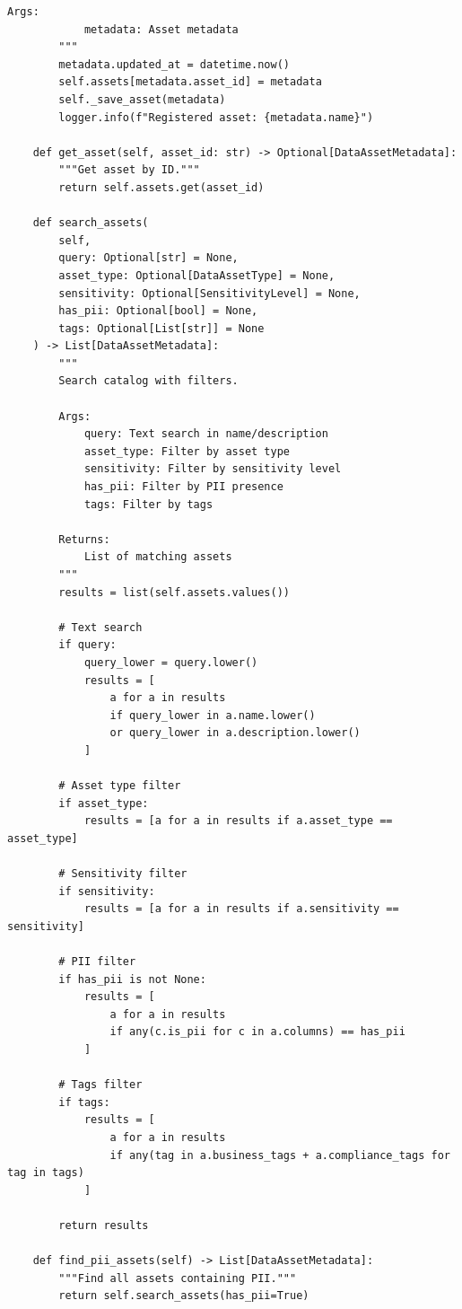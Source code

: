 \begin{lstlisting}[style=python, caption={Enterprise data catalog with automated metadata extraction}]
        Args:
            metadata: Asset metadata
        """
        metadata.updated_at = datetime.now()
        self.assets[metadata.asset_id] = metadata
        self._save_asset(metadata)
        logger.info(f"Registered asset: {metadata.name}")

    def get_asset(self, asset_id: str) -> Optional[DataAssetMetadata]:
        """Get asset by ID."""
        return self.assets.get(asset_id)

    def search_assets(
        self,
        query: Optional[str] = None,
        asset_type: Optional[DataAssetType] = None,
        sensitivity: Optional[SensitivityLevel] = None,
        has_pii: Optional[bool] = None,
        tags: Optional[List[str]] = None
    ) -> List[DataAssetMetadata]:
        """
        Search catalog with filters.

        Args:
            query: Text search in name/description
            asset_type: Filter by asset type
            sensitivity: Filter by sensitivity level
            has_pii: Filter by PII presence
            tags: Filter by tags

        Returns:
            List of matching assets
        """
        results = list(self.assets.values())

        # Text search
        if query:
            query_lower = query.lower()
            results = [
                a for a in results
                if query_lower in a.name.lower()
                or query_lower in a.description.lower()
            ]

        # Asset type filter
        if asset_type:
            results = [a for a in results if a.asset_type == asset_type]

        # Sensitivity filter
        if sensitivity:
            results = [a for a in results if a.sensitivity == sensitivity]

        # PII filter
        if has_pii is not None:
            results = [
                a for a in results
                if any(c.is_pii for c in a.columns) == has_pii
            ]

        # Tags filter
        if tags:
            results = [
                a for a in results
                if any(tag in a.business_tags + a.compliance_tags for tag in tags)
            ]

        return results

    def find_pii_assets(self) -> List[DataAssetMetadata]:
        """Find all assets containing PII."""
        return self.search_assets(has_pii=True)


\end{lstlisting}
